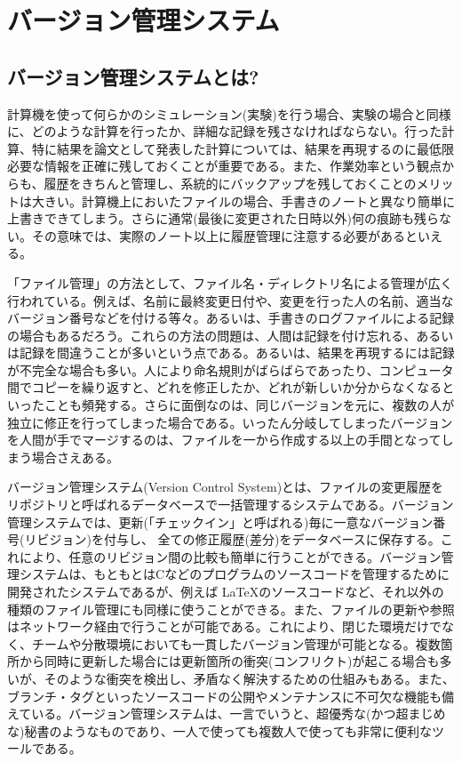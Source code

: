 \documentclass[a4j]{jsbook}
\begin{document}
\chapter{バージョン管理システム}
\section{バージョン管理システムとは?}

計算機を使って何らかのシミュレーション(実験)を行う場合、実験の場合と同様に、どのような計算を行ったか、詳細な記録を残さなければならない。行った計算、特に結果を論文として発表した計算については、結果を再現するのに最低限必要な情報を正確に残しておくことが重要である。また、作業効率という観点からも、履歴をきちんと管理し、系統的にバックアップを残しておくことのメリットは大きい。計算機上においたファイルの場合、手書きのノートと異なり簡単に上書きできてしまう。さらに通常(最後に変更された日時以外)何の痕跡も残らない。その意味では、実際のノート以上に履歴管理に注意する必要があるといえる。

「ファイル管理」の方法として、ファイル名・ディレクトリ名による管理が広く行われている。例えば、名前に最終変更日付や、変更を行った人の名前、適当なバージョン番号などを付ける等々。あるいは、手書きのログファイルによる記録の場合もあるだろう。これらの方法の問題は、人間は記録を付け忘れる、あるいは記録を間違うことが多いという点である。あるいは、結果を再現するには記録が不完全な場合も多い。人により命名規則がばらばらであったり、コンピュータ間でコピーを繰り返すと、どれを修正したか、どれが新しいか分からなくなるといったことも頻発する。さらに面倒なのは、同じバージョンを元に、複数の人が独立に修正を行ってしまった場合である。いったん分岐してしまったバージョンを人間が手でマージするのは、ファイルを一から作成する以上の手間となってしまう場合さえある。

バージョン管理システム(Version Control System)とは、ファイルの変更履歴をリポジトリと呼ばれるデータベースで一括管理するシステムである。バージョン管理システムでは、更新(「チェックイン」と呼ばれる)毎に一意なバージョン番号(リビジョン)を付与し、
全ての修正履歴(差分)をデータベースに保存する。これにより、任意のリビジョン間の比較も簡単に行うことができる。バージョン管理システムは、もともとはCなどのプログラムのソースコードを管理するために開発されたシステムであるが、例えば \LaTeX のソースコードなど、それ以外の種類のファイル管理にも同様に使うことができる。また、ファイルの更新や参照はネットワーク経由で行うことが可能である。これにより、閉じた環境だけでなく、チームや分散環境においても一貫したバージョン管理が可能となる。複数箇所から同時に更新した場合には更新箇所の衝突(コンフリクト)が起こる場合も多いが、そのような衝突を検出し、矛盾なく解決するための仕組みもある。また、ブランチ・タグといったソースコードの公開やメンテナンスに不可欠な機能も備えている。バージョン管理システムは、一言でいうと、超優秀な(かつ超まじめな)秘書のようなものであり、一人で使っても複数人で使っても非常に便利なツールである。
\end{document}
